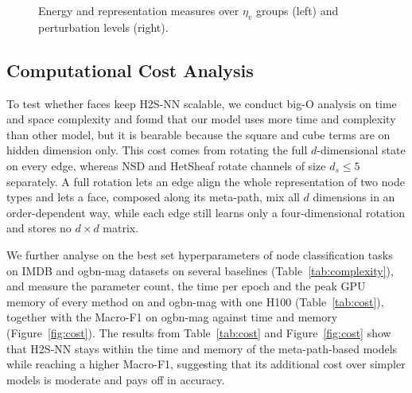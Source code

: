 \documentclass{article}
\newcommand{\method}{\textsc{H2S-NN}}
\begin{document}
\begin{figure}[!htbp]
  \centering
  \caption{Energy and representation measures over $\eta_v$ groups (left) and perturbation levels (right).}
  \label{fig:regime}
\end{figure}

\subsection{Computational Cost Analysis}
To test whether faces keep \method{} scalable, we conduct big-O analysis on time and space complexity and found that our model uses more time and complexity than other model, but it is bearable because the square and cube terms are on hidden dimension only. This cost comes from rotating the full $d$-dimensional state on every edge, whereas NSD and HetSheaf rotate channels of size $d_s\le5$ separately. A full rotation lets an edge align the whole representation of two node types and lets a face, composed along its meta-path, mix all $d$ dimensions in an order-dependent way, while each edge still learns only a four-dimensional rotation and stores no $d\times d$ matrix.

We further analyse on the best set hyperparameters of node classification tasks on IMDB and ogbn-mag datasets on several baselines (Table~\ref{tab:complexity}), and measure the parameter count, the time per epoch and the peak GPU memory of every method on  and ogbn-mag with one H100 (Table~\ref{tab:cost}), together with the Macro-F1 on ogbn-mag against time and memory (Figure~\ref{fig:cost}).  The results from Table~\ref{tab:cost} and Figure~\ref{fig:cost} show that \method{} stays within the time and memory of the meta-path-based models while reaching a higher Macro-F1, suggesting that its additional cost over simpler models is moderate and pays off in accuracy.
\end{document}

